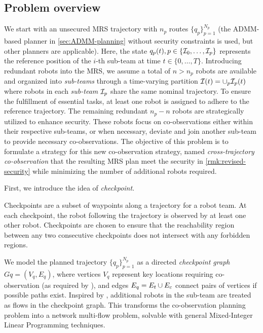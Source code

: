 \documentclass[10pt,twocolumn,twoside]{IEEEtran}
\newcommand{\news}{\color{blue}}
\begin{document}
\subsection{Problem overview}
We start with an unsecured MRS trajectory with $n_p$ routes $\{q_p\}_{p=1}^{N_p}$ (the ADMM-based planner in \cref{sec:ADMM-planning} without security constraints is used, but other planners are applicable). Here, the state $q_p(t), p \in\{\mathcal{I}_0,\ldots,\mathcal{I}_{p}\}$ represents the reference position of the $i$-th sub-team at time $t\in\{0, \dots, T\}$. Introducing redundant robots into the MRS, we assume a total of $n > n_p$ robots are available and organized into \emph{sub-teams} through a time-varying partition $\mathcal{I}(t)=\cup_p \mathcal{I}_p(t)$ where robots in each \emph{sub-team} $\mathcal{I}_p$ share the same nominal trajectory. To ensure the fulfillment of essential tasks, at least one robot is assigned to adhere to the reference trajectory. The remaining redundant $n_p-n$ robots are strategically utilized to enhance security. These robots focus on co-observations either within their respective sub-teams, or when necessary, deviate and join another sub-team to provide necessary co-observations. The objective of this problem is to formulate a strategy for this new co-observation strategy, named \emph{cross-trajectory co-observation} that the resulting MRS plan meet the security in \cref{rmk:revised-security} while minimizing the number of additional robots required. 

{\news First, we introduce the idea of \emph{checkpoint}.
\begin{definition}
  Checkpoints are a subset of waypoints along a trajectory for a robot team. At each checkpoint, the robot following the trajectory is observed by at least one other robot. Checkpoints are chosen to ensure that the reachability region between any two consecutive checkpoints does not intersect with any forbidden regions.
\end{definition}
}
We model the planned trajectory $\{q_p\}_{p=1}^{N_p}$ as a directed \emph{checkpoint graph} $G{q}=(V_{q}, E_{q})$, where vertices $V_{q}$ represent key locations requiring co-observation (as required by ), and edges $E_{q} = E_{t} \cup E_{c}$ connect pairs of vertices if possible paths exist. Inspired by \cite{yu2013multi}, additional robots in the sub-team are treated as flows in the checkpoint graph. This transforms the co-observation planning problem into a network multi-flow problem, solvable with general Mixed-Integer Linear Programming techniques.
\end{document}
